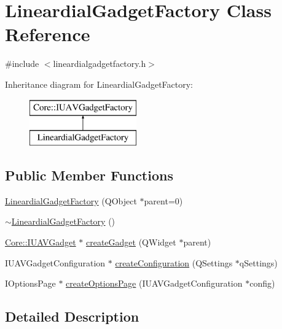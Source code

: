\hypertarget{class_lineardial_gadget_factory}{\section{\-Lineardial\-Gadget\-Factory \-Class \-Reference}
\label{class_lineardial_gadget_factory}
}


{\ttfamily \#include $<$lineardialgadgetfactory.\-h$>$}

\-Inheritance diagram for \-Lineardial\-Gadget\-Factory\-:\begin{figure}[H]
\begin{center}
\leavevmode
\includegraphics[height=2.000000cm]{class_lineardial_gadget_factory}
\end{center}
\end{figure}
\subsection*{\-Public \-Member \-Functions}
\begin{DoxyCompactItemize}
\item 
\hyperlink{group___linear_dial_plugin_ga65f46ec9f31c70119c149accc51b304e}{\-Lineardial\-Gadget\-Factory} (\-Q\-Object $\ast$parent=0)
\item 
\hyperlink{group___linear_dial_plugin_ga85102065ae14d80cf83202637c76b94c}{$\sim$\-Lineardial\-Gadget\-Factory} ()
\item 
\hyperlink{class_core_1_1_i_u_a_v_gadget}{\-Core\-::\-I\-U\-A\-V\-Gadget} $\ast$ \hyperlink{group___linear_dial_plugin_gad0365f5bab013eac15acf924e0bc2821}{create\-Gadget} (\-Q\-Widget $\ast$parent)
\item 
\-I\-U\-A\-V\-Gadget\-Configuration $\ast$ \hyperlink{group___linear_dial_plugin_ga280a4a9d168f6d6b477c30630fdb128b}{create\-Configuration} (\-Q\-Settings $\ast$q\-Settings)
\item 
\-I\-Options\-Page $\ast$ \hyperlink{group___linear_dial_plugin_gab8b7a7edac05d576e192c715acf48a22}{create\-Options\-Page} (\-I\-U\-A\-V\-Gadget\-Configuration $\ast$config)
\end{DoxyCompactItemize}


\subsection{\-Detailed \-Description}


